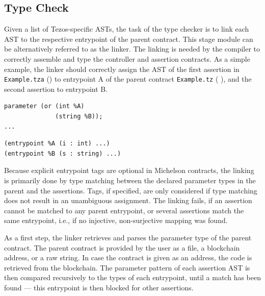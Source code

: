 \subsection{Type Check}\label{sec:typecheck}
Given a list of Tezos-specific ASTs, the task of the type checker is to link each AST to the respective entrypoint of the parent contract. This stage module can be alternatively referred to as the linker. The linking is needed by the compiler to correctly assemble and type the controller and assertion contracts. As a simple example, the linker should correctly assign the AST of the first assertion in \texttt{Example.tza} () to entrypoint A of the parent contract \texttt{Example.tz} ( ), and the second assertion to entrypoint B.

\vspace{\baselineskip}
\noindent
\begin{minipage}{.45\textwidth}
\begin{lstlisting}[label=lst:linker_parent, numbers=none, language=Michelson, caption=Example.tz]
parameter (or (int %A)
              (string %B));
...
\end{lstlisting}
\end{minipage}\hfill
\begin{minipage}{.5\textwidth}
\begin{lstlisting}[label=lst:linker_assertion, numbers=none, language=Assertion, caption=Example.tza]
(entrypoint %A (i : int) ...)
(entrypoint %B (s : string) ...)
\end{lstlisting}
\end{minipage}
\vspace{\baselineskip}

Because explicit entrypoint tags are optional in Michelson contracts, the linking is primarily done by type matching between the declared parameter types in the parent and the assertions. Tags, if specified, are only considered if type matching does not result in an unambiguous assignment. The linking fails, if an assertion cannot be matched to any parent entrypoint, or several assertions match the same entrypoint, i.e., if no injective, non-surjective mapping was found. 

As a first step, the linker retrieves and parses the parameter type of the parent contract. The parent contract is provided by the user as a file, a blockchain address, or a raw string. In case the contract is given as an address, the code is retrieved from the blockchain. The parameter pattern of each assertion AST is then compared recursively to the types of each entrypoint, until a match has been found --- this entrypoint is then blocked for other assertions.

